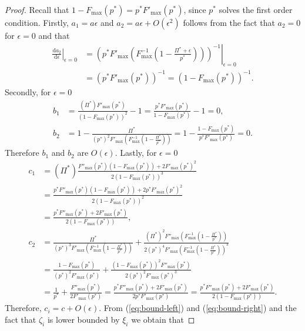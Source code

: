 \documentclass[10pt,a4paper]{amsart}
\begin{document}
\begin{proof}
    Recall that $1-F_{\max}(p^*)=p^*F'_{\max}(p^*)$, since $p^*$ solves the first order condition.
    Firstly, $a_1=a\epsilon$ and $a_2=a\epsilon+O(\epsilon^2)$ follows from the fact that $a_2=0$ for $\epsilon=0$ and that 
    \begin{align*}
        \left. \frac{\mathrm{d} a_2}{\mathrm{d} \epsilon} \right|_{\epsilon = 0}&=
    \left. \left(p^*F'_{\max}\left(F^{-1}_{\max}\left(1-\frac{\Pi^*+\epsilon}{p^*}\right)\right)\right)^{-1} \right|_{\epsilon = 0}\\
    &=(p^*F'_{\max}(p^*))^{-1}=(1-F_{\max}(p^*))^{-1}.
    \end{align*}
    Secondly, for $\epsilon=0$ 
    \begin{align*}    
        b_1&=\frac{(\Pi^*)F'_{\max}(p^*)}{(1-F_{\max}(p^*))^2}-1=\frac{p^*F'_{\max}\left(p^*\right)}{1-F_{\max}(p^*)}-1=0,\\
        b_2&=1-\frac{\Pi^*}{(p^*)^2F'_{\max}\left(F^{-1}_{\max}\left(1-\frac{\Pi^*}{p^*}\right)\right)}=1-\frac{1-F_{\max}(p^*)}{p^*F'_{\max}\left(p^*\right)}=0.
    \end{align*}
    Therefore $b_1$ and $b_2$ are $O(\epsilon)$. Lastly, for $\epsilon=0$ 
    \begin{align*}    
        c_1&=(\Pi^*)\frac{F''_{\max}(p^*)(1-F_{\max}(p^*))+2F'_{\max}(p^*)^2}{2(1-F_{\max}(p^*))^3}\\
        &=\frac{p^*F''_{\max}(p^*)(1-F_{\max}(p^*))+2p^*F'_{\max}(p^*)^2}{2(1-F_{\max}(p^*))^2}\\
        &=\frac{p^*F''_{\max}(p^*)+2F'_{\max}(p^*)}{2(1-F_{\max}(p^*))},\\
        c_2&=\frac{\Pi^*}{(p^*)^3F'_{\max}\left(F^{-1}_{\max}\left(1-\frac{\Pi^*}{p^*}\right)\right)}+\frac{(\Pi^*)^2F''_{\max}\left(F^{-1}_{\max}\left(1-\frac{\Pi^*}{p^*}\right)\right)}{2(p^*)^4F'_{\max}\left(F^{-1}_{\max}\left(1-\frac{\Pi^*}{p^*}\right)\right)^3}\\
        &=\frac{1-F_{\max}(p^*)}{(p^*)^2F'_{\max}\left(p^*\right)}+\frac{(1-F_{\max}(p^*))^2F''_{\max}\left(p^*\right)}{2(p^*)^2F'_{\max}\left(p^*\right)^3}\\
        &=\frac{1}{p^*}+\frac{F''_{\max}\left(p^*\right)}{2F'_{\max}\left(p^*\right)}=\frac{p^*F''_{\max}(p^*)+2F'_{\max}(p^*)}{2p^*F'_{\max}(p^*)}=\frac{p^*F''_{\max}(p^*)+2F'_{\max}(p^*)}{2(1-F_{\max}(p^*))}.
    \end{align*}
    Therefore, $c_i=c+O(\epsilon)$. From (\ref{eq:bound-left}) and (\ref{eq:bound-right}) and the fact that $\zeta_i$ is lower bounded by $\xi_i$ we obtain that

\end{proof}
\end{document}
